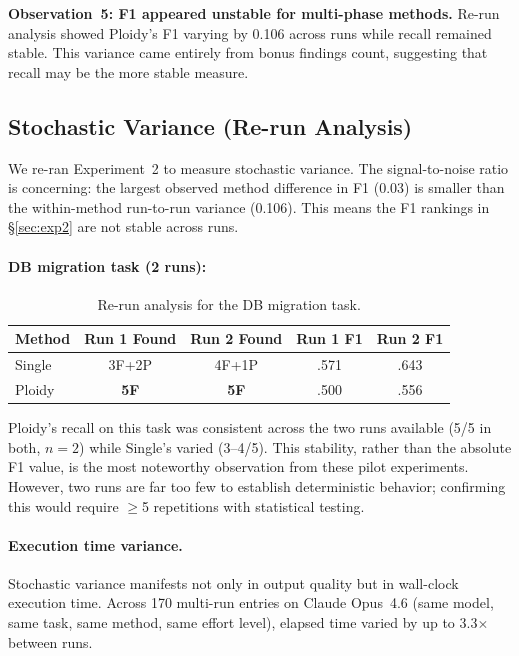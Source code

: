 \documentclass[11pt]{article}
\begin{document}
\textbf{Observation~5: F1 appeared unstable for multi-phase methods.} Re-run analysis showed Ploidy's F1 varying by 0.106 across runs while recall remained stable. This variance came entirely from bonus findings count, suggesting that recall may be the more stable measure.

\subsection{Stochastic Variance (Re-run Analysis)}
\label{sec:rerun}

We re-ran Experiment~2 to measure stochastic variance. The signal-to-noise ratio is concerning: the largest observed method difference in F1 (0.03) is smaller than the within-method run-to-run variance (0.106). This means the F1 rankings in \S\ref{sec:exp2} are not stable across runs.

\paragraph{DB migration task (2 runs):}

\begin{table}[H]
\centering
\caption{Re-run analysis for the DB migration task.}
\label{tab:rerun}
\small
\begin{tabular}{@{}lcccc@{}}
\toprule
\textbf{Method} & \textbf{Run 1 Found} & \textbf{Run 2 Found} & \textbf{Run 1 F1} & \textbf{Run 2 F1} \\
\midrule
Single & 3F+2P & 4F+1P & .571 & .643 \\
Ploidy & \textbf{5F} & \textbf{5F} & .500 & .556 \\
\bottomrule
\end{tabular}
\end{table}

Ploidy's recall on this task was consistent across the two runs available (5/5 in both, $n{=}2$) while Single's varied (3--4/5). This stability, rather than the absolute F1 value, is the most noteworthy observation from these pilot experiments. However, two runs are far too few to establish deterministic behavior; confirming this would require $\geq$5 repetitions with statistical testing.

\paragraph{Execution time variance.} Stochastic variance manifests not only in output quality but in wall-clock execution time. Across 170 multi-run entries on Claude Opus~4.6 (same model, same task, same method, same effort level), elapsed time varied by up to 3.3$\times$ between runs.
\end{document}
